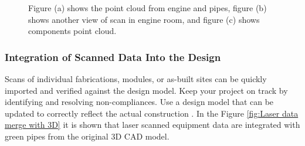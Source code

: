 \begin{figure}[H]
  \centering
  \hfill
  \hfill
  
  \caption[Engine Room Scans from Different Views]{Figure (a) shows the point cloud from engine and pipes, figure (b) shows another view of scan in engine room, and figure (c) shows components point cloud.}
\label{fig:Engine Room scan in a Ship} \cite{3DScan}
\end{figure}

\subsubsection{Integration of Scanned Data Into the Design}
Scans of individual fabrications, modules, or as-built sites can be quickly imported and verified against the design model. 
Keep your project on track by identifying and resolving non-compliances. Use a design model that can be updated to correctly reflect the actual construction \cite{AVEVAE3D}. In the Figure \ref{fig:Laser data merge with 3D} it is shown that laser scanned equipment data are integrated with green pipes from the original 3D CAD model. 

